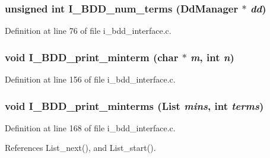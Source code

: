 \subsubsection{\setlength{\rightskip}{0pt plus 5cm}unsigned int I\_\-BDD\_\-num\_\-terms (Dd\-Manager $\ast$ {\em dd})}\label{i__bdd__interface_8c_5ee404a84ec9bb9654a15d7ecb4e6284}




Definition at line 76 of file i\_\-bdd\_\-interface.c.
\subsubsection{\setlength{\rightskip}{0pt plus 5cm}void I\_\-BDD\_\-print\_\-minterm (char $\ast$ {\em m}, int {\em n})}\label{i__bdd__interface_8c_95c73f2a41675f4c5b086ff494956fa2}




Definition at line 156 of file i\_\-bdd\_\-interface.c.
\subsubsection{\setlength{\rightskip}{0pt plus 5cm}void I\_\-BDD\_\-print\_\-minterms (\bf{List} {\em mins}, int {\em terms})}\label{i__bdd__interface_8c_95ebeaffd46005bfd656992c81cdf442}




Definition at line 168 of file i\_\-bdd\_\-interface.c.

References List\_\-next(), and List\_\-start().